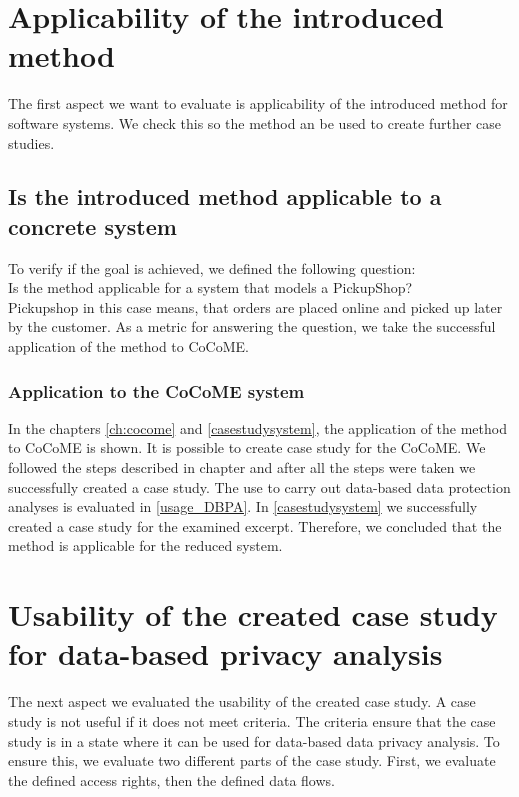 \section{Applicability of the introduced method}
The first aspect we want to evaluate is applicability of the introduced method for software systems. We check this so the method an be used to create further case studies. 
\subsection{Is the introduced method applicable to a concrete system}
To verify if the goal is achieved, we defined the following question:\\
Is the method applicable for a system that models a PickupShop?\\
Pickupshop in this case means, that orders are placed online and picked up later by the customer.
As a metric for answering the question, we take the successful application of the method to CoCoME. 
\subsubsection{Application to the CoCoME system}
In the chapters \autoref{ch:cocome} and \autoref{casestudysystem}, the application of the method to CoCoME is shown. It is possible to create case study for the CoCoME. We followed the steps described in chapter  and after all the steps were taken we successfully created a case study. The use to carry out data-based data protection analyses is evaluated in  \autoref{usage_DBPA}. In \autoref{casestudysystem} we successfully created a case study for the examined excerpt. Therefore, we concluded that the method is applicable for the reduced system.
\section{Usability of the created case study for data-based privacy analysis}
\label{usage_DBPA}
The next aspect we evaluated the usability of the created case study. A case study is not useful if it does not meet criteria. The criteria ensure that the case study is in a state where it can be used for data-based data privacy analysis. To ensure this, we evaluate two different parts of the case study. First, we evaluate the defined access rights, then the defined data flows. 
